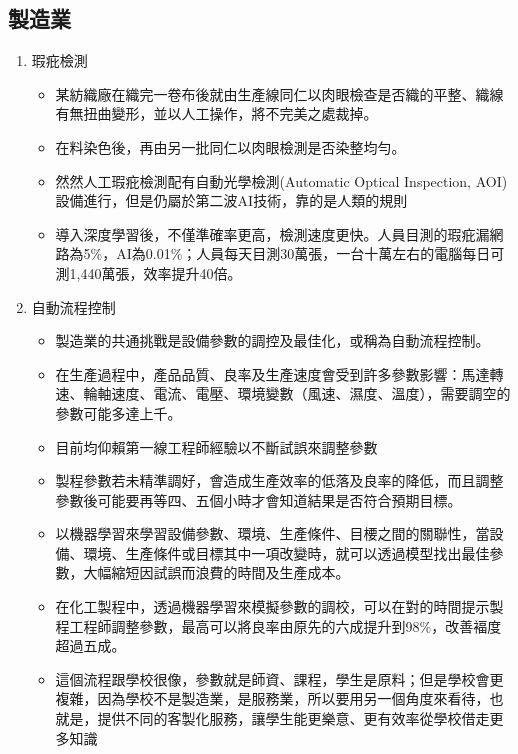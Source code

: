 \documentclass[a4paper,12pt]{article}
\begin{document}
\subsection{製造業}
\label{sec:org6baff1d}
\begin{enumerate}
\item 瑕疪檢測
\label{sec:org72a4151}
\begin{itemize}
\item 某紡織廠在織完一卷布後就由生產線同仁以肉眼檢查是否織的平整、織線有無扭曲變形，並以人工操作，將不完美之處裁掉。\\
\item 在料染色後，再由另一批同仁以肉眼檢測是否染整均勻。\\
\item 然然人工瑕疪檢測配有自動光學檢測(Automatic Optical Inspection, AOI)設備進行，但是仍屬於第二波AI技術，靠的是人類的規則\\
\item 導入深度學習後，不僅準確率更高，檢測速度更快。人員目測的瑕疪漏網路為5\%，AI為0.01\%；人員每天目測30萬張，一台十萬左右的電腦每日可測1,440萬張，效率提升40倍。\\
\end{itemize}
\item 自動流程控制
\label{sec:orgce375ce}
\begin{itemize}
\item 製造業的共通挑戰是設備參數的調控及最佳化，或稱為自動流程控制。\\
\item 在生產過程中，產品品質、良率及生產速度會受到許多參數影響：馬達轉速、輪軸速度、電流、電壓、環境變數（風速、濕度、溫度），需要調空的參數可能多達上千。\\
\item 目前均仰賴第一線工程師經驗以不斷試誤來調整參數\\
\item 製程參數若未精準調好，會造成生產效率的低落及良率的降低，而且調整參數後可能要再等四、五個小時才會知道結果是否符合預期目標。\\
\item 以機器學習來學習設備參數、環境、生產條件、目楆之間的關聯性，當設備、環境、生產條件或目標其中一項改變時，就可以透過模型找出最佳參數，大幅縮短因試誤而浪費的時間及生產成本。\\
\item 在化工製程中，透過機器學習來模擬參數的調校，可以在對的時間提示製程工程師調整參數，最高可以將良率由原先的六成提升到98\%，改善褔度超過五成。\\
\item 這個流程跟學校很像，參數就是師資、課程，學生是原料；但是學校會更複雜，因為學校不是製造業，是服務業，所以要用另一個角度來看待，也就是，提供不同的客製化服務，讓學生能更樂意、更有效率從學校借走更多知識\\

\end{itemize}
\end{enumerate}
\end{document}
